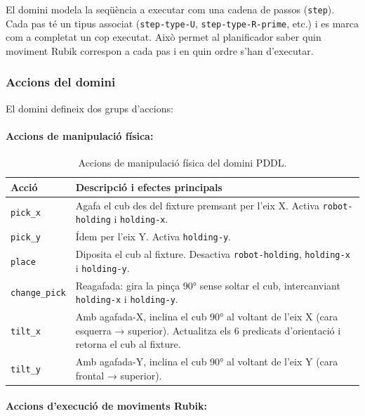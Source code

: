 \documentclass[12pt, a4paper]{article}
\begin{document}
El domini modela la seqüència a executar com una cadena de passos (\texttt{step}). Cada pas té un tipus associat (\texttt{step-type-U}, \texttt{step-type-R-prime}, etc.) i es marca com a completat un cop executat. Això permet al planificador saber quin moviment Rubik correspon a cada pas i en quin ordre s'han d'executar.

\subsubsection{Accions del domini}

El domini defineix dos grups d'accions:

\paragraph{Accions de manipulació física:}

\begin{table}[H]
  \centering
  \begin{tabular}{lp{9.5cm}}
    \toprule
    \textbf{Acció} & \textbf{Descripció i efectes principals} \\
    \midrule
    \texttt{pick\_x} & Agafa el cub des del fixture premsant per l'eix X. Activa \texttt{robot-holding} i \texttt{holding-x}. \\
    \texttt{pick\_y} & Ídem per l'eix Y. Activa \texttt{holding-y}. \\
    \texttt{place}   & Diposita el cub al fixture. Desactiva \texttt{robot-holding}, \texttt{holding-x} i \texttt{holding-y}. \\
    \texttt{change\_pick} & Reagafada: gira la pinça 90° sense soltar el cub, intercanviant \texttt{holding-x} i \texttt{holding-y}. \\
    \texttt{tilt\_x} & Amb agafada-X, inclina el cub 90° al voltant de l'eix X (cara esquerra → superior). Actualitza els 6 predicats d'orientació i retorna el cub al fixture. \\
    \texttt{tilt\_y} & Amb agafada-Y, inclina el cub 90° al voltant de l'eix Y (cara frontal → superior). \\
    \bottomrule
  \end{tabular}
  \caption{Accions de manipulació física del domini PDDL.}
  \label{tab:pddl_manip}
\end{table}

\paragraph{Accions d'execució de moviments Rubik:}
\end{document}
